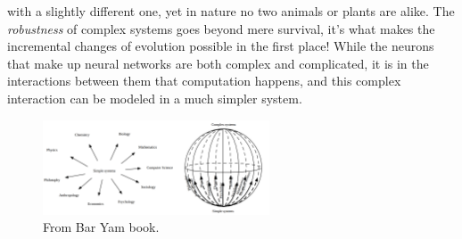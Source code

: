 with a slightly different one, yet in nature no two animals or plants are alike.
The \emph{robustness} of complex systems goes beyond mere survival, it's what
makes the incremental changes of evolution possible in the first place!
%
While the neurons that make up neural networks are both complex and complicated,
it is in the interactions between them that computation happens, and this
complex interaction can be modeled in a much simpler system.
\par
\begin{figure}[h!]
  \centering
  \includegraphics[width=0.6\textwidth]{fig/BarYamCX.png}
  \caption{From Bar Yam book.}
  \label{figCX}
\end{figure}
